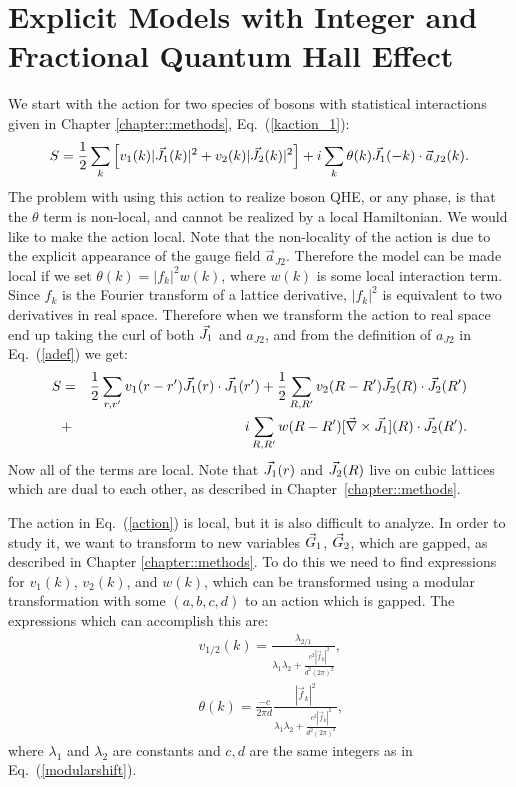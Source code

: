 \section{Explicit Models with Integer and Fractional Quantum Hall Effect}
\label{sec::demon} 

We start with the action for two species of bosons with statistical interactions given in Chapter \ref{chapter::methods}, Eq.~(\ref{kaction_1}):
\begin{eqnarray}
S=\frac{1}{2}\sum_k \left[v_1(k)|\vec{J}_1(k)|^2+v_2(k)|\vec{J}_2(k)|^2\right]
+i\sum_k \theta(k)\vec{J}_1(-k)\cdot \vec{a}_{J2}(k).
\label{kaction_2}
\end{eqnarray}
The problem with using this action to realize boson QHE, or any phase, is that the $\theta$ term is non-local, and cannot be realized by a local Hamiltonian. We would like to make the action local. Note that the non-locality of the action is due to the explicit appearance of the gauge field $\vec{a}_{J2}$. Therefore the model can be made local if we set $\theta(k)=|f_k|^2 w(k)$, where $w(k)$ is some local interaction term. Since $f_k$ is the Fourier transform of a lattice derivative, $|f_k|^2$ is equivalent to two derivatives in real space. Therefore when we transform the action to real space end up taking the curl of both $\vec{J}_1$ and $a_{J2}$, and from the definition of $a_{J2}$ in Eq.~(\ref{adef}) we get:
\begin{eqnarray}
S&=&\frac{1}{2} \sum_{r,r'} v_1(r-r')\vec{J}_1(r)\cdot\vec{J}_1(r')
+\frac{1}{2}\sum_{R,R'} v_2(R-R')\vec{J}_2(R)\cdot\vec{J}_2(R')\nonumber\\
&+&i\sum_{R,R'}  w(R-R')[\vec{\nabla}\times\vec{J}_1](R)\cdot\vec{J}_2(R').
\label{action}
\end{eqnarray}
Now all of the terms are local. Note that $\vec{J}_1(r)$ and $\vec{J}_2(R)$ live on cubic lattices which are dual to each other, as described in Chapter~\ref{chapter::methods}. 

The action in Eq.~(\ref{action}) is local, but it is also difficult to analyze. In order to study it, we want to transform to new variables $\vec{G}_1$, $\vec{G}_2$, which are gapped, as described in Chapter \ref{chapter::methods}. To do this we need to find expressions for $v_1(k)$, $v_2(k)$, and $w(k)$, which can be transformed using a modular transformation with some $(a,b,c,d)$ to an action which is gapped. The expressions which can accomplish this are: 
\begin{eqnarray}
&&v_{1/2}(k)=\frac{\lambda_{2/1}}{\lambda_1\lambda_2+\frac{c^2|\vec{f}_k|^2}{d^2(2\pi)^2}}, \label{vintro}\\
&&\theta(k)=\frac{-c}{2\pi d}\frac{|\vec{f}_k|^2}{\lambda_1\lambda_2+\frac{c^2|\vec{f}_k|^2}{d^2(2\pi)^2}},\label{tintro}
\end{eqnarray}
where $\lambda_1$ and $\lambda_2$ are constants and $c,d$ are the same integers as in Eq.~(\ref{modularshift}).

